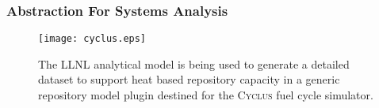 \begin{frame}[ctb!]
  \frametitle{Abstraction For Systems Analysis}
\begin{figure}[htb!]
  \begin{center}
    \texttt{[image: cyclus.eps]}
  \end{center}
  \caption{The LLNL analytical model is being used to generate a detailed 
  dataset to support heat based repository capacity in a generic repository 
  model plugin destined for the \textsc{Cyclus} fuel cycle simulator.}
  \label{fig:cyclus}
\end{figure}
\end{frame}
